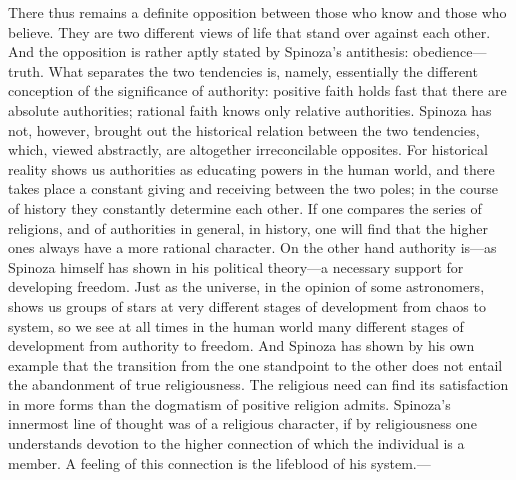 \documentclass[12pt]{book}
\newcommand{\opage}[1]{\marginnote{\footnotesize\textit{[#1]}}}
\begin{document}
There thus remains a definite opposition between those who know and those who believe.
They are two different views of life that stand over against each other. %
And \opage{161}the opposition is rather aptly stated by Spinoza's antithesis:
obedience---truth. What separates the two tendencies is, namely, essentially the different
conception of the significance of authority: positive faith holds fast that there are
absolute authorities; rational faith knows only relative authorities. Spinoza has not,
however, brought out the historical relation between the two tendencies, which, viewed
abstractly, are altogether irreconcilable opposites. For historical reality shows us
authorities as educating powers in the human world, and there takes place a constant
giving and receiving between the two poles; in the course of history they constantly
determine each other. If one compares the series of religions, and of authorities in
general, in history, one will find that the higher ones always have a more rational
character. On the other hand authority is---as Spinoza himself has shown in his political
theory---a necessary support for developing freedom. Just as the universe, in the opinion
of some astronomers, shows us groups of stars at very different stages of development
from chaos to system, so we see at all times in the human world many different stages of
development from authority to freedom. And Spinoza has shown by his own example that the
transition from the one standpoint to the other does not entail the abandonment of true
religiousness. The religious need can find its satisfaction in more forms than the
dogmatism of positive religion admits. Spinoza's innermost line of thought was of a
religious character, if by religiousness one understands \opage{162}devotion to the
higher connection of which the individual is a member. A feeling of this connection is the
lifeblood of his system.---
\end{document}

